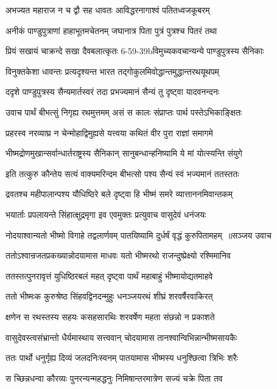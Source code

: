 \twolineshloka
{अभज्यत महाराज न च द्वौ सह धावतः}
{आविद्धरनागाश्वं पतितध्वजकूबरम्}


\twolineshloka
{अनीकं पाण्डुपुत्राणां हाहाभूतमचेतनम्}
{जघानात्र पिता पुत्रं पुत्रश्च पितरं तथा}


\twolineshloka
{प्रियं सखायं चाक्रन्दे सखा दैवबलात्कृतः}
{6-59-39bविमुच्यकवचान्यन्ये पाण्डुपुत्रस्य सैनिकाः}


\twolineshloka
{विनुक्तकेशा धावन्तः प्रत्यदृश्यन्त भारत}
{तद्गोकुलमिवोद्धान्तमुद्धान्तरथयूथपम्}


\twolineshloka
{ददृशे पाण्डुपुत्रस्य सैन्यमार्तस्वरं तदा}
{प्रभज्यमानं सैन्यं तु दृष्ट्वा यादवनन्दनः}


\twolineshloka
{उवाच पार्थं बीभत्सुं निगृह्य रथमुत्तमम्}
{असं स कालः संप्राप्तः पार्थ पस्तेऽभिकाङ्क्षितः}


\threelineshloka
{प्रहरस्व नरव्याघ्र न चेन्मोहाद्विमुह्यसे}
{यत्त्वया कथितं वीर पुरा राज्ञां समागमे}
{}


\twolineshloka
{भीष्मद्रोणमुखान्सर्वान्धार्तराष्ट्रस्य सैनिकान्}
{सानुबन्धान्हनिष्यामि ये मां योत्स्यन्ति संयुगे}


\twolineshloka
{इति तत्कुरु कौन्तेय सत्यं वाक्यमरिन्दम}
{बीभत्सो पश्य सैन्यं स्वं भज्यमानं ततस्ततः}


\twolineshloka
{द्रवतश्च महीपालान्पश्य यौधिष्ठिरे बले}
{दृष्ट्वा हि भीष्मं समरे व्यात्ताननमिवान्तकम्}


\twolineshloka
{भयार्ताः प्रपलायन्ते सिंहात्क्षुद्रमृगा इव}
{एवमुक्तः प्रत्युवाच वासुदेवं धनंजयः}


\threelineshloka
{नोदयाश्वान्यतो भीष्मो विगाहे तद्वलार्णवम्}
{पातयिष्यामि दुर्धर्षं वृद्धं कुरुपितामहम् ॥सञ्जय उवाच}
{}


\twolineshloka
{ततोऽश्वान्रजतप्रकख्यान्नोदयामास माधवः}
{यतो भीष्मरथो राजन्दुष्प्रेक्ष्यो रश्मिमानिव}


\twolineshloka
{ततस्तत्पुनरावृत्तं युधिष्ठिरबलं महत्}
{दृष्ट्वा पार्थं महाबाहुं भीष्मायोद्यतमाहवे}


\twolineshloka
{ततो भीष्मःक कुरुश्रेष्ठ सिंहवद्विनदन्मुहुः}
{धनञ्जयरथं शीघ्रं शरवर्षैरवाकिरत्}


\twolineshloka
{क्षणेन स रथस्तस्य सहयः कसहसारथिः}
{शरवर्षेण महता संछन्नो न प्रकाशते}


\twolineshloka
{वासुदेवस्त्वसंभ्रान्तो धैर्यमास्थाय सत्त्ववान्}
{चोदयामास तानश्वान्विभिन्नान्भीष्मसायकैः}


\twolineshloka
{ततः पार्थो धनुर्गृह्य दिव्यं जलदनिःस्वनम्}
{पातयामास भीष्मस्य धनुश्छित्वा त्रिभिः शरैः}


\twolineshloka
{स च्छिन्नधन्वा कौरव्यः पुनरन्यन्महद्धनुः}
{निमिषान्तरमात्रेण सज्यं चक्रे पिता तव}


